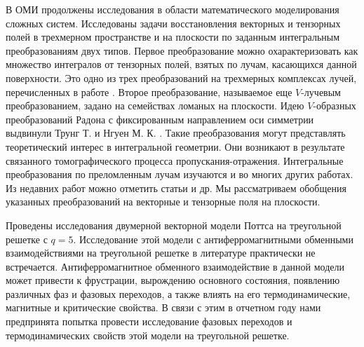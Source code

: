В ОМИ продолжены исследования в области математического моделирования сложных систем. Исследованы задачи восстановления векторных и тензорных полей в трехмерном пространстве и на плоскости по заданным интегральным преобразованиям двух типов. Первое преобразование можно охарактеризовать как множество интегралов от тензорных полей, взятых по лучам, касающихся данной поверхности. Это одно из трех преобразований на трехмерных комплексах лучей, перечисленных в работе \cite{Medzhidov}.
Второе преобразование, называемое еще $V$-лучевым преобразованием, задано на семействах ломаных на плоскости. Идею $V$-образных преобразований Радона с фиксированным направлением оси симметрии выдвинули Трунг Т. и Нгуен М. К. \cite{Truong}. Такие преобразования могут представлять теоретический интерес в интегральной геометрии. Они возникают в результате связанного томографического процесса пропускания-отражения. Интегральные преобразования по преломленным лучам изучаются и во многих других работах. Из недавних работ можно отметить статьи \cite{Sharafutdinov,Ambartsoumian}  и др.
Мы рассматриваем обобщения указанных преобразований на векторные и тензорные поля на плоскости.

Проведены исследования двумерной векторной модели Поттса на треугольной решетке с $q = 5$. Исследование этой модели с антиферромагнитными обменными взаимодействиями на треугольной решетке в литературе практически не встречается. Антиферромагнитное обменного взаимодействие в данной модели может привести к фрустрации, вырождению основного состояния, появлению различных фаз и фазовых переходов, а также влиять на его термодинамические, магнитные и критические свойства. В связи с этим в отчетном году нами предпринята попытка провести исследование фазовых переходов и термодинамических свойств этой модели на треугольной решетке. 